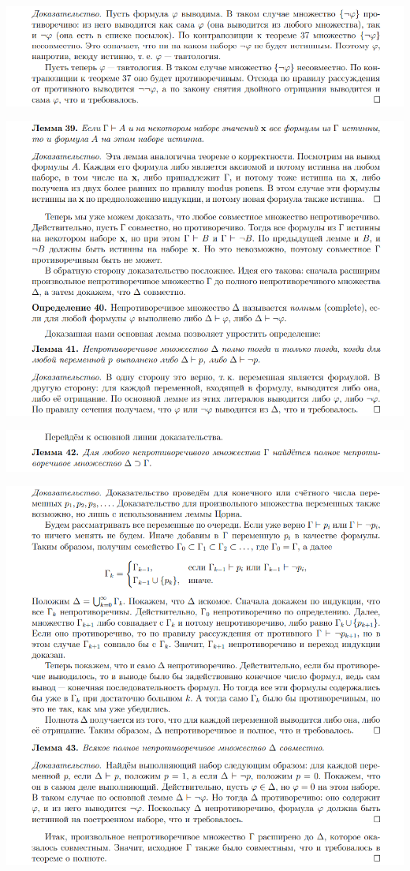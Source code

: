 \includegraphics[width=0.93\linewidth]{images/proof_for_prop_1.png}

\includegraphics[width=0.93\linewidth]{images/three_lemms_for_full.png}

\includegraphics[width=0.93\linewidth]{images/the_last_lemm_full.png}

\includegraphics[width=0.93\linewidth]{images/end_of_proof_full.png}


